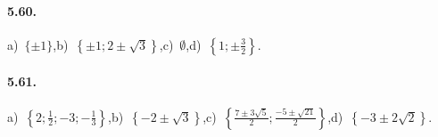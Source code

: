 \paragraph{5.60.} a)~$\{\pm 1\}$,\quad b)~$\left\{\pm 1;2\pm \sqrt 3\right\}$,\quad c)~$\emptyset$,\quad d)~$\left\{1;\pm\frac 3 2\right\}$.

\paragraph{5.61.} a)~$\left\{2;\frac 1 2;-3;-\frac 1 3\right\}$,\quad b)~$\left\{-2\pm \sqrt 3\right\}$,\quad c)~$\left\{\frac{7\pm 3\sqrt 5} 2;\frac{-5\pm \sqrt{21}} 2\right\}$,\quad d)~$\left\{-3\pm 2\sqrt 2\right\}$.

